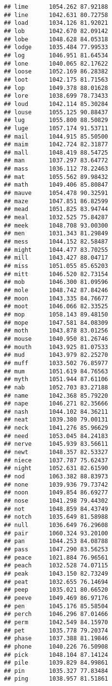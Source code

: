 \documentclass[
]{article}
\begin{document}
\begin{verbatim}
## lime      1054.262 87.92188
## line      1042.631 80.72758
## load      1034.126 81.92021
## lob       1042.670 82.09142
## lobe      1048.628 84.05318
## lodge     1035.484 77.99533
## log       1046.951 81.64534
## lone      1040.065 82.17622
## loose     1052.169 86.28382
## loot      1042.175 81.71563
## lop       1049.378 88.01628
## lore      1038.699 78.73433
## loud      1042.114 85.30284
## louse     1055.125 90.88437
## lug       1055.800 88.50829
## luge      1057.174 91.53711
## mail      1044.915 85.50500
## maim      1042.724 82.31877
## mall      1048.419 88.54725
## man       1037.297 83.64772
## mass      1036.112 78.22463
## mat       1055.562 89.98432
## math      1049.406 85.80847
## mauve     1054.478 90.32591
## maze      1047.851 86.82599
## mead      1051.825 83.94744
## meal      1032.525 75.84287
## meek      1048.708 93.00300
## men       1031.343 81.29849
## mess      1044.152 82.58487
## might     1044.477 83.70255
## mill      1043.427 88.04717
## miss      1051.055 85.65203
## mitt      1046.520 82.73154
## mob       1046.300 81.09596
## mole      1048.742 87.84246
## moon      1043.335 84.76677
## moot      1046.066 82.33525
## mop       1058.143 89.48150
## mope      1047.581 84.08309
## moth      1043.878 83.01256
## mouse     1040.950 81.26746
## mouth     1043.925 81.07533
## mud       1043.979 82.25270
## muff      1033.502 76.85977
## mum       1051.619 84.76563
## myth      1051.944 87.61106
## nab       1052.703 83.27188
## name      1042.368 85.79220
## nape      1046.271 82.35666
## nash      1044.102 84.36211
## neat      1039.380 79.00131
## neck      1041.276 85.96629
## need      1053.045 84.24183
## nerve     1045.939 83.56611
## newt      1048.357 82.53327
## niece     1037.787 75.62437
## night     1052.631 82.61590
## nod       1063.382 88.83973
## none      1039.936 79.73742
## noon      1049.854 86.69277
## nose      1041.298 79.44302
## not       1048.859 84.43749
## notch     1035.649 81.58988
## null      1036.649 76.29608
## pair      1060.324 93.20100
## pan       1044.253 84.08788
## pass      1047.290 83.56253
## peace     1021.884 76.96561
## peach     1032.528 74.07115
## peak      1043.150 82.73249
## peat      1032.655 76.14694
## peep      1035.021 80.66520
## peeve     1049.469 86.97176
## pen       1045.176 85.58504
## perch     1046.296 87.01466
## perm      1042.549 84.15970
## pet       1035.778 79.20374
## phase     1037.388 81.19846
## phone     1040.226 76.50908
## pick      1048.104 87.14124
## pile      1039.829 84.99861
## pin       1035.327 77.83484
## ping      1038.957 81.51861

\end{verbatim}
\end{document}

